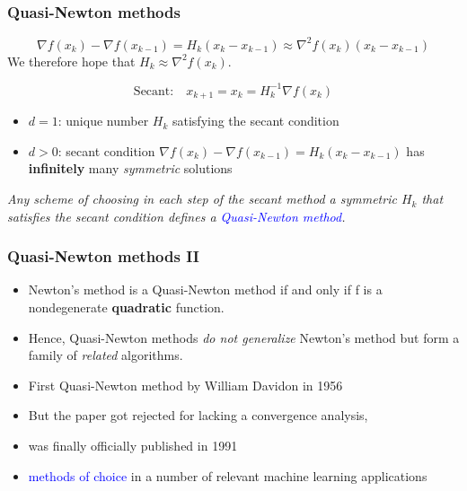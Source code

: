 \documentclass{beamer}
\begin{document}
\begin{frame}
  \frametitle{Quasi-Newton methods}

  \begin{equation}
    \nabla f(x_k) - \nabla f(x_{k-1}) = H_k (x_k - x_{k-1}) \approx \nabla^2 f(x_k) (x_k - x_{k-1})
  \end{equation}
  We therefore hope that $H_k \approx \nabla^2 f(x_k)$.

  \begin{equation}
    \text{Secant:} \quad x_{k+1} = x_k = H_k^{-1} \nabla f(x_k)
  \end{equation}

  \begin{itemize}
    \item $d=1$: unique number $H_k$ satisfying the secant condition
    \item $d>0$: secant condition $\nabla f(x_k) - \nabla f(x_{k-1}) = H_k (x_k - x_{k-1})$ has \textbf{infinitely} many \textit{symmetric} solutions
  \end{itemize}

  \begin{block}{}
    \textit{Any scheme of choosing in each step of the secant method a symmetric $H_k$ that satisfies the secant condition defines a \textcolor{blue}{Quasi-Newton method}.}
  \end{block}


\end{frame}

\begin{frame}
  \frametitle{Quasi-Newton methods II}

  \begin{itemize}
    \item Newton’s method is a Quasi-Newton method if and only if f is a nondegenerate \textbf{quadratic} function.
    \item Hence, Quasi-Newton methods \textit{do not generalize} Newton’s method but form a
          family of \textit{related} algorithms.
    \item First Quasi-Newton method by William Davidon in 1956
    \item But the paper got rejected for lacking a convergence analysis,
    \item was finally officially published in 1991
    \item \textcolor{blue}{methods of choice} in a number of relevant machine learning applications
  \end{itemize}

\end{frame}
\end{document}

